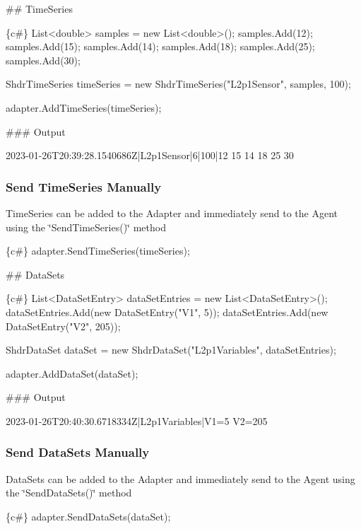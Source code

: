 \#\# Time\+Series 
\begin{DoxyCode}
\{c#\}
List<double> samples = new List<double>();
samples.Add(12);
samples.Add(15);
samples.Add(14);
samples.Add(18);
samples.Add(25);
samples.Add(30);

ShdrTimeSeries timeSeries = new ShdrTimeSeries("L2p1Sensor", samples, 100);

adapter.AddTimeSeries(timeSeries);
\end{DoxyCode}
 \#\#\# Output 
\begin{DoxyCode}
2023-01-26T20:39:28.1540686Z|L2p1Sensor|6|100|12 15 14 18 25 30
\end{DoxyCode}


\subsubsection*{Send Time\+Series Manually}

Time\+Series can be added to the Adapter and immediately send to the Agent using the \char`\"{}\+Send\+Time\+Series()\char`\"{} method 
\begin{DoxyCode}
\{c#\}
adapter.SendTimeSeries(timeSeries);
\end{DoxyCode}


\#\# Data\+Sets 
\begin{DoxyCode}
\{c#\}
List<DataSetEntry> dataSetEntries = new List<DataSetEntry>();
dataSetEntries.Add(new DataSetEntry("V1", 5));
dataSetEntries.Add(new DataSetEntry("V2", 205));

ShdrDataSet dataSet = new ShdrDataSet("L2p1Variables", dataSetEntries);

adapter.AddDataSet(dataSet);
\end{DoxyCode}
 \#\#\# Output 
\begin{DoxyCode}
2023-01-26T20:40:30.6718334Z|L2p1Variables|V1=5 V2=205
\end{DoxyCode}


\subsubsection*{Send Data\+Sets Manually}

Data\+Sets can be added to the Adapter and immediately send to the Agent using the \char`\"{}\+Send\+Data\+Sets()\char`\"{} method 
\begin{DoxyCode}
\{c#\}
adapter.SendDataSets(dataSet);
\end{DoxyCode}


